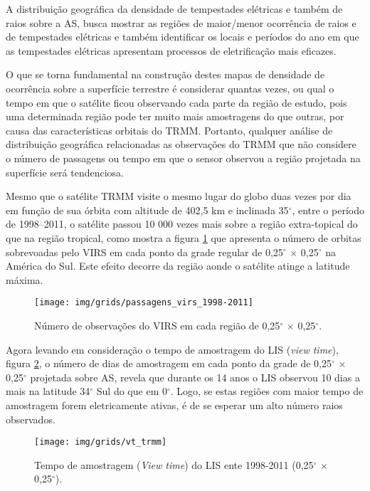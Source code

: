 A distribuição geográfica da densidade de tempestades elétricas e também de raios sobre a AS, busca mostrar as regiões de maior/menor ocorrência de raios e de tempestades elétricas e também identificar os locais e períodos do ano em que as tempestades elétricas apresentam processos de eletrificação mais eficazes.  

O que se torna fundamental na construção destes mapas de densidade de ocorrência sobre a superfície terrestre é considerar quantas vezes, ou qual o tempo em que o satélite ficou observando cada parte da região de estudo, pois uma determinada região pode ter muito mais amostragens do que outras, por causa das características orbitais do TRMM. Portanto, qualquer análise de distribuição geográfica relacionadas as observações do TRMM que não considere o número de passagens ou tempo em que o sensor observou a região projetada na superfície será tendenciosa. 

Mesmo que o satélite TRMM visite o mesmo lugar do globo duas vezes por dia em função de sua órbita com altitude de 402,5 km e  inclinada 35$^{\circ}$, entre o período de 1998--2011, o satélite passou {10 000} vezes mais sobre a região extra-topical do que na região tropical, como mostra a figura \ref{VirsVT} que apresenta o número de orbitas sobrevoadas pelo VIRS em cada ponto da grade regular de 0,25$^{\circ}$  $\times$ 0,25$^{\circ}$ na América do Sul. Este efeito decorre da região aonde o satélite atinge a latitude máxima.

\begin{figure}[!hb]
  \centering
  {{\texttt{[image: img/grids/passagens\_virs\_1998-2011]}}}
\caption{Número de observações do VIRS em cada região de 0,25$^{\circ}$  $\times$ 0,25$^{\circ}$.}
\label{VirsVT}
\end{figure} 


Agora levando em consideração o tempo de amostragem do LIS (\textit{view time}), figura \ref{lisVT}, o número de dias de amostragem em cada ponto da grade de 0,25$^{\circ}$  $\times$ 0,25$^{\circ}$ projetada sobre AS, revela que durante os 14 anos o LIS observou 10 dias a mais na latitude 34$^{\circ}$ Sul do que em 0$^{\circ}$. Logo, se estas regiões com maior tempo de amostragem forem eletricamente ativas, é de se esperar um alto número raios observados.

\begin{figure}[!ht]
  \centering
  {{\texttt{[image: img/grids/vt\_trmm]}} }
  \caption{Tempo de amostragem (\textit{View time}) do LIS ente 1998-2011 (0,25$^{\circ}$  $\times$ 0,25$^{\circ}$).}
\label{lisVT}
\end{figure} 

